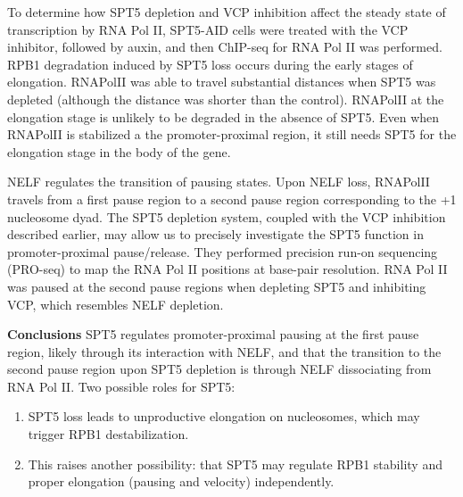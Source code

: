 To determine how SPT5 depletion and VCP inhibition affect the steady state of transcription by RNA Pol II, SPT5-AID cells were treated with the VCP inhibitor, followed by auxin, and then ChIP-seq for RNA Pol II was performed. RPB1 degradation induced by SPT5 loss occurs during the early stages of elongation. RNAPolII was able to travel substantial distances when SPT5 was depleted (although the distance was shorter than the control). RNAPolII at the elongation stage is unlikely to be degraded in the absence of SPT5. Even when RNAPolII is stabilized a the promoter-proximal region, it still needs SPT5 for the elongation stage in the body of the gene.

NELF regulates the transition of pausing states. Upon NELF loss, RNAPolII travels from a first pause region to a second pause region corresponding to the +1 nucleosome dyad. The SPT5 depletion system, coupled with the VCP inhibition described earlier, may allow us to precisely
investigate the SPT5 function in promoter-proximal pause/release. They performed precision run-on sequencing (PRO-seq) to map the RNA Pol II positions at base-pair resolution. RNA Pol II was paused at the second pause regions when depleting SPT5 and inhibiting VCP, which resembles NELF depletion.

\textbf{Conclusions}
SPT5 regulates promoter-proximal pausing at the first pause region, likely through its interaction with NELF, and that the transition to the second pause region upon SPT5 depletion is through NELF dissociating from RNA Pol II.
Two possible roles for SPT5:
\begin{enumerate}
\item SPT5 loss leads to unproductive elongation on nucleosomes, which may trigger RPB1 destabilization.
\item This raises another possibility: that SPT5 may regulate RPB1 stability and
proper elongation (pausing and velocity) independently.
\end{enumerate}

